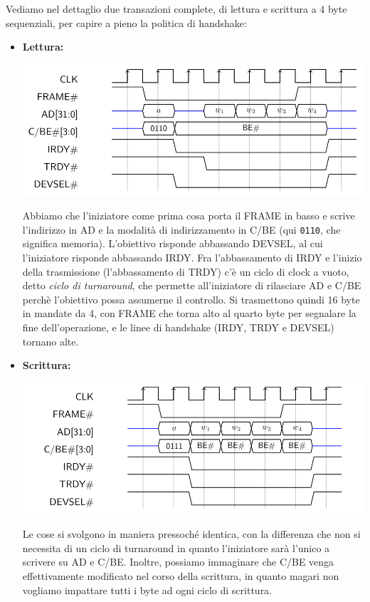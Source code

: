 \documentclass[a4paper,11pt]{article}
\begin{document}
Vediamo nel dettaglio due transazioni complete, di lettura e scrittura a 4 byte sequenziali, per capire a pieno la politica di handshake:
\begin{itemize}
	\item \textbf{Lettura:} 
	\begin{center}
		\includegraphics[scale=0.5]{../figures/pci_read.png}
	\end{center}
	Abbiamo che l'iniziatore come prima cosa porta il FRAME in basso e scrive l'indirizzo in AD e la modalità di indirizzamento in C/BE (qui \lstinline|0110|, che significa memoria).
	L'obiettivo risponde abbassando DEVSEL, al cui l'iniziatore risponde abbassando IRDY. 
	Fra l'abbassamento di IRDY e l'inizio della trasmissione (l'abbassamento di TRDY) c'è un ciclo di clock a vuoto, detto \textit{ciclo di turnaround}, che permette all'iniziatore di rilasciare AD e C/BE perchè l'obiettivo possa assumerne il controllo.
	Si trasmettono quindi 16 byte in mandate da 4, con FRAME che torna alto al quarto byte per segnalare la fine dell'operazione, e le linee di handshake (IRDY, TRDY e DEVSEL) tornano alte.

	\item \textbf{Scrittura:} 
	\begin{center}
		\includegraphics[scale=0.5]{../figures/pci_write.png}
	\end{center}
	Le cose si svolgono in maniera pressoché identica, con la differenza che non si necessita di un ciclo di turnaround in quanto l'iniziatore sarà l'unico a scrivere su AD e C/BE. Inoltre, possiamo immaginare che C/BE venga effettivamente modificato nel corso della scrittura, in quanto magari non vogliamo impattare tutti i byte ad ogni ciclo di scrittura.
\end{itemize}
\end{document}
